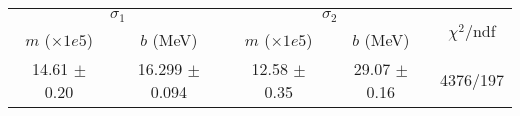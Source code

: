 \begin{tabular}{cc|cc||c}
\multicolumn{2}{c|}{$\sigma_1$} & \multicolumn{2}{|c}{$\sigma_2$}  & \multirow{2}{*}{$\chi^2/$ndf}\\
$m$ ($\times1e5$) & $b$ (MeV) & $m$ ($\times1e5$) & $b$ (MeV)  & \\
\hline
14.61 $\pm$ 0.20 & 16.299 $\pm$ 0.094 & 12.58 $\pm$ 0.35 & 29.07 $\pm$ 0.16 & 4376/197\\
\end{tabular}
